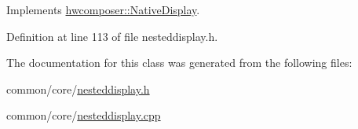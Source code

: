 Implements \mbox{\hyperlink{classhwcomposer_1_1NativeDisplay_a9a18c3dfba567c86c088b06febda4019}{hwcomposer\+::\+Native\+Display}}.



Definition at line 113 of file nesteddisplay.\+h.


\begin{DoxyCode}{0}
\end{DoxyCode}


The documentation for this class was generated from the following files\+:\begin{DoxyCompactItemize}
\item 
common/core/\mbox{\hyperlink{nesteddisplay_8h}{nesteddisplay.\+h}}\item 
common/core/\mbox{\hyperlink{nesteddisplay_8cpp}{nesteddisplay.\+cpp}}\end{DoxyCompactItemize}
